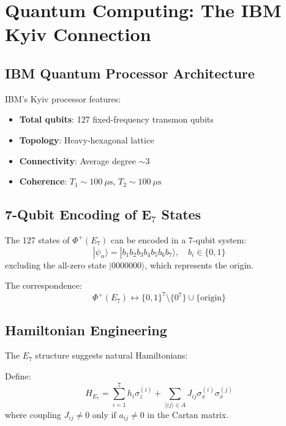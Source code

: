 \section{Quantum Computing: The IBM Kyiv Connection}

\subsection{IBM Quantum Processor Architecture}

IBM's Kyiv processor features:
\begin{itemize}
    \item \textbf{Total qubits}: 127 fixed-frequency transmon qubits
    \item \textbf{Topology}: Heavy-hexagonal lattice
    \item \textbf{Connectivity}: Average degree $\sim 3$
    \item \textbf{Coherence}: $T_1 \sim 100~\mu\text{s}$, $T_2 \sim 100~\mu\text{s}$
\end{itemize}

\subsection{7-Qubit Encoding of E$_7$ States}

\begin{theorem}
\label{thm:e7_qubit_encoding}
The 127 states of $\Phi^+(E_7)$ can be encoded in a 7-qubit system:
\begin{equation}
|\psi_\alpha\rangle = |b_1 b_2 b_3 b_4 b_5 b_6 b_7\rangle, \quad b_i \in \{0, 1\}
\end{equation}
excluding the all-zero state $|0000000\rangle$, which represents the origin.

The correspondence:
\begin{equation}
\Phi^+(E_7) \longleftrightarrow \{0, 1\}^7 \setminus \{0^7\} \cup \{\text{origin}\}
\end{equation}
\end{theorem}

\subsection{Hamiltonian Engineering}

The $E_7$ structure suggests natural Hamiltonians:

\begin{definition}
\label{def:e7_hamiltonian}
Define:
\begin{equation}
H_{E_7} = \sum_{i=1}^{7} h_i \sigma_z^{(i)} + \sum_{\langle ij \rangle \in A} J_{ij} \sigma_x^{(i)} \sigma_x^{(j)}
\end{equation}
where coupling $J_{ij} \neq 0$ only if $a_{ij} \neq 0$ in the Cartan matrix.
\end{definition}


